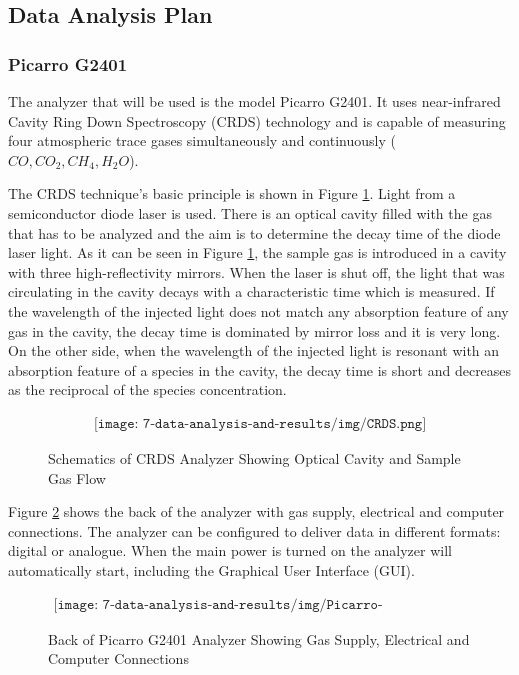 \subsection{Data Analysis Plan}

\subsubsection{Picarro G2401}

The analyzer that will be used is the model Picarro G2401. It uses near-infrared Cavity Ring Down Spectroscopy (CRDS) technology and is capable of measuring four atmospheric trace gases simultaneously and continuously ($CO, CO_2, CH_4, H_2O$).

The CRDS technique's basic principle is shown in Figure \ref{fig:CRDS}. Light from a semiconductor diode laser is used. There is an optical cavity filled with the gas that has to be analyzed and the aim is to determine the decay time of the diode laser light. As it can be seen in Figure \ref{fig:CRDS}, the sample gas is introduced in a cavity with three high-reflectivity mirrors. When the laser is shut off, the light that was circulating in the cavity decays with a characteristic time which is measured. If the wavelength of the injected light does not match any absorption feature of any gas in the cavity, the decay time is dominated by mirror loss and it is very long. On the other side, when the wavelength of the injected light is resonant with an absorption feature of a species in the cavity, the decay time is short and decreases as the reciprocal of the species concentration.



\begin{figure}[H]
    \begin{align*}
        \texttt{[image: 7-data-analysis-and-results/img/CRDS.png]}
    \end{align*}
    \caption{Schematics of CRDS Analyzer Showing Optical Cavity and Sample Gas Flow \cite{Picarro}\label{fig:CRDS}}
\end{figure}


Figure \ref{fig:Picarro-interfaces} shows the back of the analyzer with gas supply, electrical and computer connections. The analyzer can be configured to deliver data in different formats: digital or analogue. When the main power is turned on the analyzer will automatically start, including the Graphical User Interface (GUI). 

\begin{figure}[H]
    \begin{align*}
        \texttt{[image: 7-data-analysis-and-results/img/Picarro-interfaces.png]}
    \end{align*}
    \caption{Back of Picarro G2401 Analyzer Showing Gas Supply, Electrical and Computer Connections \cite{Picarrouserguide}\label{fig:Picarro-interfaces}}
\end{figure}


